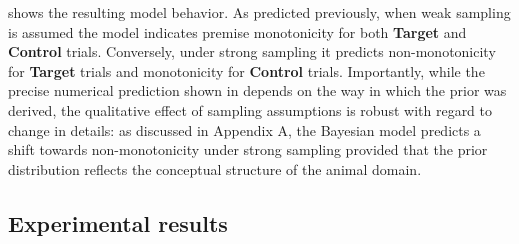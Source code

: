 \documentclass[doc,12pt]{apa}
\begin{document}
 shows the resulting model behavior. As predicted previously, when weak sampling is assumed the model indicates premise monotonicity for both {\bf Target} and {\bf Control} trials. Conversely, under strong sampling it predicts non-monotonicity for {\bf Target} trials and monotonicity for {\bf Control} trials. Importantly, while the precise numerical prediction shown in  depends on the way in which the prior was derived, the qualitative effect of sampling assumptions is robust with regard to change in details: as discussed in Appendix A, the Bayesian model predicts a shift towards non-monotonicity under strong sampling provided that the prior distribution reflects the conceptual structure of the animal domain.

\subsection{Experimental results}
\end{document}
